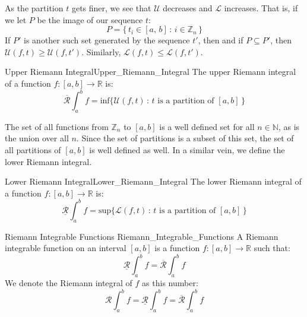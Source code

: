 \documentclass[crop=false,class=article]{standalone}                           %
\begin{document}
        \par\vspace{2.5ex}
        As the partition $t$ gets finer, we see that $\mathcal{U}$ decreases
        and $\mathcal{L}$ increases. That is, if we let $P$ be the image of
        our sequence $t$:
        \begin{equation}
            P=\{\,t_{i}\in[a,\,b]\,:\,i\in\mathbb{Z}_{n}\,\}
        \end{equation}
        If $P'$ is another such set generated by the sequence $t'$, then
        and if $P\subseteq{P}'$, then $\mathcal{U}(f,t)\geq\mathcal{U}(f,t')$.
        Similarly, $\mathcal{L}(f,t)\leq\mathcal{L}(f,t')$.
        \begin{fdefinition}{Upper Riemann Integral}{Upper_Riemann_Integral}
            The upper Riemann integral of a function
            $f:[a,b]\rightarrow\mathbb{R}$ is:
            \begin{equation}
                \overline{\mathcal{R}}\int_{a}^{b}f
                =\textrm{inf}\{\mathcal{U}(f,t)\,:\,t
                    \textrm{ is a partition of }[a,b]\,\}
            \end{equation}
        \end{fdefinition}
        The set of all functions from $\mathbb{Z}_{n}$ to $[a,b]$ is a well
        defined set for all $n\in\mathbb{N}$, as is the union over all $n$.
        Since the set of partitions is a subset of this set, the set of all
        partitions of $[a,b]$ is well defined as well. In a similar vein, we
        define the lower Riemann integral.
        \begin{fdefinition}{Lower Riemann Integral}{Lower_Riemann_Integral}
            The lower Riemann integral of a function
            $f:[a,b]\rightarrow\mathbb{R}$ is:
            \begin{equation}
                \underline{\mathcal{R}}\int_{a}^{b}f
                =\textrm{sup}\{\mathcal{L}(f,t)\,:\,t
                    \textrm{ is a partition of }[a,b]\,\}
            \end{equation}
        \end{fdefinition}
        \begin{fdefinition}{Riemann Integrable Functions}
                           {Riemann_Integrable_Functions}
            A Riemann integrable function on an interval $[a,b]$ is a
            function $f:[a,b]\rightarrow\mathbb{R}$ such that:
            \begin{equation}
                \underline{\mathcal{R}}\int_{a}^{b}f
                =\overline{\mathcal{R}}\int_{a}^{b}f
            \end{equation}
            We denote the Riemann integral of $f$ as this number:
            \begin{equation}
                \mathcal{R}\int_{a}^{b}f
                =\underline{\mathcal{R}}\int_{a}^{b}f
                =\overline{\mathcal{R}}\int_{a}^{b}f
            \end{equation}
        \end{fdefinition}
\end{document}
